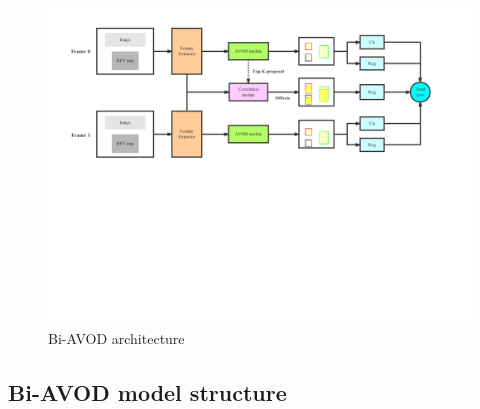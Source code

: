 \documentclass{bmvc2k}
\begin{document}
\begin{figure}
	\rule{0pt}{1ex}
	\setlength{\abovecaptionskip}{-1.0cm}
	\begin{center}
		\includegraphics[trim={0cm, 10cm, 3cm, 1cm}, clip, width=\textwidth]{images/Bi-AVOD.pdf}
	\end{center}
	\caption{Bi-AVOD architecture}
	\label{fig:bi-avod}
	\vspace{-0.4cm}
\end{figure}

\subsection{Bi-AVOD model structure}
\end{document}
